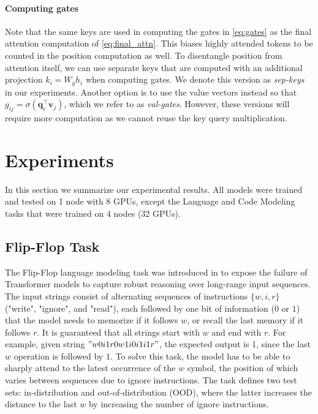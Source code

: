 \documentclass{article}
\renewcommand{\vec}{\mathbf}
\begin{document}
\paragraph{Computing gates}
Note that the same keys are used in computing the gates in \cref{eq:gates} as the final attention computation of \cref{eq:final_attn}.
This biases highly attended tokens to be counted in the position computation as well.
To disentangle position from attention itself, we can use  separate keys that are computed with an additional projection $k_i=W_g h_i$ when computing gates. We denote this version as \emph{sep-keys} in our experiments.
Another option is to use the value vectors instead so that $g_{ij} = \sigma(\vec{q}_i^\top \vec{v}_j)$, which we refer to as \emph{val-gates}.
However, these versions will require more computation as we cannot reuse the key query multiplication.


\section{Experiments}
\label{sec:experiments}

In this section we summarize our experimental results. All models were trained and tested on 1 node with 8 GPUs, except the Language and Code Modeling tasks that were trained on 4 nodes (32 GPUs).  

\subsection{Flip-Flop Task}
The Flip-Flop language modeling task was introduced in \citet{liu2024exposing} to expose the failure of Transformer models to capture robust reasoning over long-range input sequences. The input strings consist of alternating sequences of instructions $\{w, i, r\}$ ("write", "ignore", and "read"), each followed by one bit of information ($0$ or $1$) that the model needs to memorize if it follows $w$, or recall the last memory if it follows $r$. It is guaranteed that all strings start with $w$ and end with $r$. For example, given string $"w0i1r0w1i0i1i1r"$, the expected output is $1$, since the last $w$ operation is followed by $1$.
To solve this task, the model has to be able to sharply attend to the latest occurrence of the $w$ symbol, the position of which varies between sequences due to ignore instructions. The task defines two test sets: in-distribution and out-of-distribution (OOD), where the latter increases the distance to the last $w$ by increasing the number of ignore instructions.
\end{document}
